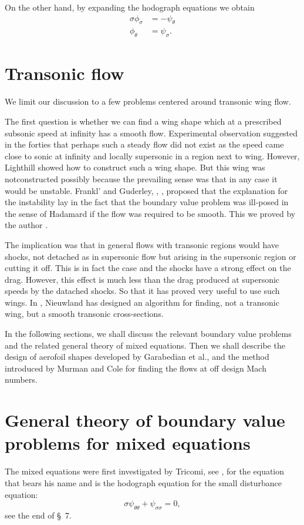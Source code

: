 On the other hand, by expanding the hodograph equations we obtain
\begin{align*}
\sigma \phi_\sigma & = -\psi_\theta\\
\phi_\theta & = \psi_\sigma. 
\end{align*}

\section{Transonic flow}\label{chap3:sec3.7}
We limit our discussion to a few problems centered around transonic wing flow.

The first question is whether we can find a wing shape which at a prescribed subsonic speed at infinity has a smooth flow. Experimental observation suggested in the forties that perhaps such a steady flow did not exist as the speed came close to sonic at infinity and locally supersonic in a region next to wing. However, Lighthill \cite{key25} showed how to construct such a wing shape. But this wing was not\pageoriginale constructed possibly because the prevailing sense was that in any case it would be unstable. Frankl' and Guderley, \cite{key10}, \cite{key16}, proposed that the explanation for the instability lay in the fact that the boundary value problem was ill-posed in the sense of Hadamard if the flow was required to be smooth. This we proved by the author \cite{key29}. 

The implication was that in general flows with transonic regions would have shocks, not detached as in supersonic flow but arising in the supersonic region or cutting it off. This is in fact the case and the shocks have a strong effect on the drag. However, this effect is much less than the drag produced at supersonic speeds by the datached shocks. So that it has proved very useful to use such wings. In \cite{key33}, Nieuwland has designed an algorithm for finding, not a transonic wing, but a smooth transonic cross-sections.

In the following sections, we shall discuss the relevant boundary value problems and the related general theory of mixed equations. Then we shall describe the design of aerofoil shapes developed by Garabedian et al., and the method introduced by Murman and Cole for finding the flows at off design Mach numbers.

\section[General theory of boundary value...]{General theory of
  boundary value problems for mixed equations}\label{chap3:sec3.8} 
The mixed equations were first investigated by Tricomi, see
\cite{key36}, for the equation that bears his name and is the
hodograph equation for the small disturbance equation: 
\begin{equation*}
\sigma \psi_{\theta \theta} + \psi_{\sigma\sigma} = 0, \tag{3.20}\label{eq3.20}
\end{equation*}\pageoriginale
see the end of \S\ 7.

